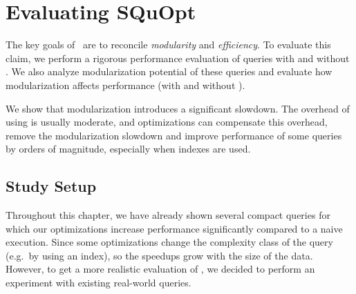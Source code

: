 \newcommand{\graphPath}[1]{aosd13/graphs/#1}

\chapter{Evaluating SQuOpt}
\label{sec:evaluation}
\label{ch:aosd13-evaluation}

The key goals of \LoS\ are to reconcile \emph{modularity} and \emph{efficiency}. To evaluate this claim, we perform a rigorous performance evaluation of queries with and without \LoS{}. We also analyze modularization potential of these queries and evaluate how modularization affects performance (with and without \LoS{}).

We show that modularization introduces a significant slowdown. The overhead of
using \LoS{} is usually moderate, and optimizations can compensate this overhead, remove the
modularization slowdown and improve performance of some queries by orders of
magnitude, especially when indexes are used.


\section{Study Setup}
Throughout this chapter, we have already shown several compact queries for which our optimizations increase performance significantly compared to a naive execution. Since some optimizations change
the complexity class of the query (e.g.\ by using an index), so the speedups grow with the size of the data. However, to get a more realistic evaluation of \LoS{}, we decided to perform an experiment with existing real-world queries.

